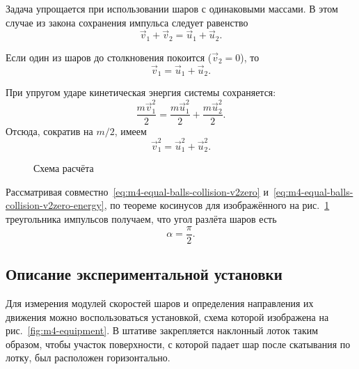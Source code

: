 \documentclass[a4paper, 12pt]{extarticle}
\begin{document}
Задача упрощается при использовании шаров с одинаковыми массами. В этом случае из закона сохранения импульса следует равенство
\begin{equation}
\label{eq:m4-equal-balls-collision}
\vec v_1 + \vec v_2 = \vec u_1 + \vec u_2.
\end{equation}

Если один из шаров до столкновения покоится ($\vec v_2
= 0$), то
\begin{equation}
\label{eq:m4-equal-balls-collision-v2zero}
\vec v_1 = \vec u_1 + \vec u_2.
\end{equation}


При упругом ударе кинетическая энергия системы сохраняется:
\[
\frac{m\vec v_1^2}{2} = \frac{m \vec u_1^2}{2} + \frac{m \vec u_2^2}{2}.
\]
Отсюда, сократив на $m/2$, имеем
\begin{equation}
\label{eq:m4-equal-balls-collision-v2zero-energy}
\vec v_1^2 = \vec u_1^2 + \vec u_2^2.
\end{equation}

\begin{figure}[t]
\begin{center}
\end{center}
\caption{Схема расчёта \label{fig:m4-momentum-triangle}}
\end{figure}

Рассматривая совместно~\eqref{eq:m4-equal-balls-collision-v2zero} и~\eqref{eq:m4-equal-balls-collision-v2zero-energy}, по теореме косинусов для изображённого на рис.~\ref{fig:m4-momentum-triangle} треугольника импульсов получаем, что угол разлёта шаров есть %
\[
\alpha = \frac{\pi}{2}.
\]

\subsection{Описание экспериментальной установки}
Для измерения модулей скоростей шаров и определения направления их движения можно воспользоваться установкой, схема которой изображена на рис.~\ref{fig:m4-equipment}. В штативе закрепляется наклонный лоток таким образом, чтобы участок поверхности, с которой падает шар после скатывания по лотку, был расположен горизонтально. %
\end{document}
